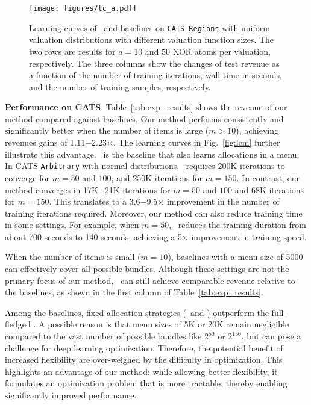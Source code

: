 \begin{figure}
    \centering
    \texttt{[image: figures/lc\_a.pdf]}
    \caption{Learning curves of \name~and baselines on \texttt{CATS Regions} with uniform valuation distributions with different valuation function sizes. The two rows are results for $a=10$ and $50$ XOR atoms per valuation, respectively. The three columns show the changes of test revenue as a function of the number of training iterations, wall time in seconds, and the number of training samples, respectively.
    \label{fig:lca}}
\end{figure}

\textbf{Performance on CATS}. Table~\ref{tab:exp_results} shows the revenue of our method compared against baselines. Our method performs consistently and significantly better when the number of items is large ($m>10$), achieving revenues gains of 1.11$-$2.23$\times$. The learning curves in Fig.~\ref{fig:lcm} further illustrate this advantage. \bundle~is the baseline that also learns allocations in a menu. In CATS \texttt{Arbitrary} with normal distributions, \bundle~requires 200K iterations to converge for $m=50$ and $100$, and 250K iterations for $m=150$. In contrast, our method converges in 17K$-$21K iterations for $m=50$ and $100$ and 68K iterations for $m=150$. This translates to a 3.6$-$9.5$\times$ improvement in the number of training iterations required. Moreover, our method can also reduce training time in some settings. For example, when $m=50$, \name~reduces the training duration from about 700 seconds to 140 seconds, achieving a 5$\times$  improvement in training speed.



When the number of items is small ($m=10$), baselines with a menu size of 5000 can effectively cover all possible bundles. Although these settings are not the primary focus of our method, \name~can still achieve comparable revenue relative to the baselines, as shown in the first column of Table~\ref{tab:exp_results}.

Among the baselines, fixed allocation strategies (\smallbundle~and \bigbundle) outperform the full-fledged \bundle. A possible reason is that menu sizes of 5K or 20K remain negligible compared to the vast number of possible bundles like $2^{50}$ or $2^{150}$, but can pose a challenge for deep learning optimization. Therefore, the potential benefit of increased flexibility are over-weighed by the difficulty in optimization. This highlights an advantage of our method: while allowing better flexibility, it formulates an optimization problem that is more tractable, thereby enabling significantly improved performance.

